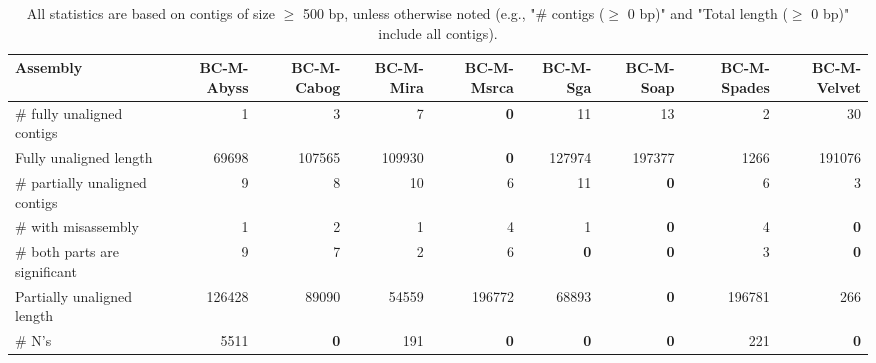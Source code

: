 \documentclass[12pt,a4paper]{article}
\begin{document}
\begin{table}[ht]
\begin{center}
\caption{All statistics are based on contigs of size $\geq$ 500 bp, unless otherwise noted (e.g., "\# contigs ($\geq$ 0 bp)" and "Total length ($\geq$ 0 bp)" include all contigs).}
\begin{tabular}{|l*{8}{|r}|}
\hline
Assembly & BC-M-Abyss & BC-M-Cabog & BC-M-Mira & BC-M-Msrca & BC-M-Sga & BC-M-Soap & BC-M-Spades & BC-M-Velvet \\ \hline
\# fully unaligned contigs & 1 & 3 & 7 & {\bf 0} & 11 & 13 & 2 & 30 \\ \hline
Fully unaligned length & 69698 & 107565 & 109930 & {\bf 0} & 127974 & 197377 & 1266 & 191076 \\ \hline
\# partially unaligned contigs & 9 & 8 & 10 & 6 & 11 & {\bf 0} & 6 & 3 \\ \hline
\hspace{5mm}\# with misassembly & 1 & 2 & 1 & 4 & 1 & {\bf 0} & 4 & {\bf 0} \\ \hline
\hspace{5mm}\# both parts are significant & 9 & 7 & 2 & 6 & {\bf 0} & {\bf 0} & 3 & {\bf 0} \\ \hline
Partially unaligned length & 126428 & 89090 & 54559 & 196772 & 68893 & {\bf 0} & 196781 & 266 \\ \hline
\# N's & 5511 & {\bf 0} & 191 & {\bf 0} & {\bf 0} & {\bf 0} & 221 & {\bf 0} \\ \hline
\end{tabular}
\end{center}
\end{table}
\end{document}
